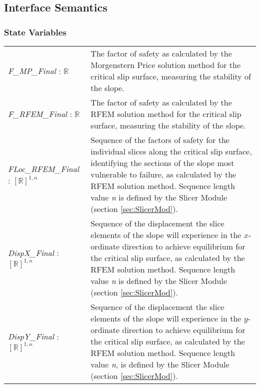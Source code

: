 \documentclass[12pt]{article}
\begin{document}
\subsection{Interface Semantics}

\subsubsection{State Variables}
\renewcommand{\arraystretch}{1.5}
\begin{longtable}{p{} p{}}
  \textit{F\_MP\_Final} : $\mathbb{R}$ & The factor of safety as
  calculated by the Morgenstern Price solution method for the
  critical slip surface, measuring the stability of the slope. \\

  \textit{F\_RFEM\_Final} : $\mathbb{R}$ & The factor of safety as
  calculated by the RFEM solution method for the critical slip
  surface, measuring the stability of the slope. \\

  \textit{FLoc\_RFEM\_Final} : $[\mathbb{R}]^{1,n}$ & Sequence of the
  factors of safety for the individual slices along the critical slip
  surface, identifying the sections of the slope most vulnerable to
  failure, as calculated by the RFEM solution method. Sequence length
  value \textit{n} is defined by the Slicer Module (section
  \ref{sec:SlicerMod}).\\

  \textit{DispX\_Final} : $[\mathbb{R}]^{1,n}$ & Sequence of the
  displacement the slice elements of the slope will experience in the
  $x$-ordinate direction to achieve equilibrium for the critical slip
  surface, as calculated by the RFEM solution method. Sequence length
  value \textit{n} is defined by the Slicer Module (section
  \ref{sec:SlicerMod}).\\

  \textit{DispY\_Final} : $[\mathbb{R}]^{1,n}$ & Sequence of the
  displacement the slice elements of the slope will experience in the
  $y$-ordinate direction to achieve equilibrium for the critical slip
  surface, as calculated by the RFEM solution method. Sequence length
  value \textit{n}, is defined by the Slicer Module (section
  \ref{sec:SlicerMod}). \\
\end{longtable}
\end{document}
